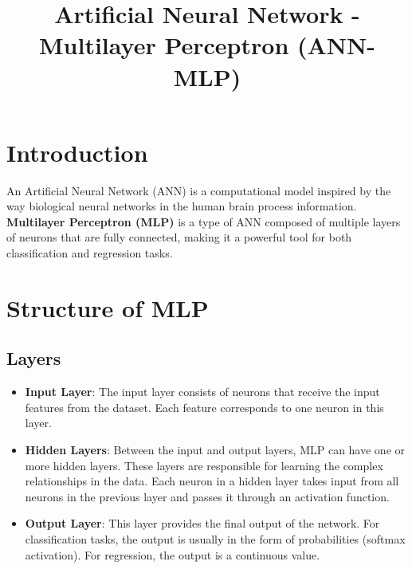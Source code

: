 \documentclass{article}
\title{Artificial Neural Network - Multilayer Perceptron (ANN-MLP)}
\author{}
\date{}
\begin{document}
	
	\maketitle
	
	\section{Introduction}
	An Artificial Neural Network (ANN) is a computational model inspired by the way biological neural networks in the human brain process information. \textbf{Multilayer Perceptron (MLP)} is a type of ANN composed of multiple layers of neurons that are fully connected, making it a powerful tool for both classification and regression tasks.
	
	\section{Structure of MLP}
	
	\subsection{Layers}
	\begin{itemize}
		\item \textbf{Input Layer}: The input layer consists of neurons that receive the input features from the dataset. Each feature corresponds to one neuron in this layer.
		\item \textbf{Hidden Layers}: Between the input and output layers, MLP can have one or more hidden layers. These layers are responsible for learning the complex relationships in the data. Each neuron in a hidden layer takes input from all neurons in the previous layer and passes it through an activation function.
		\item \textbf{Output Layer}: This layer provides the final output of the network. For classification tasks, the output is usually in the form of probabilities (softmax activation). For regression, the output is a continuous value.
	\end{itemize}
	
\end{document}
